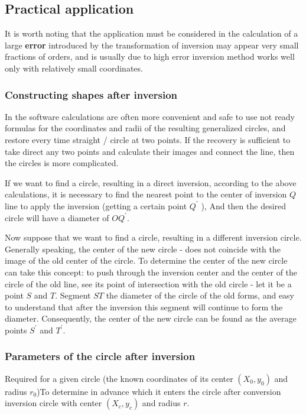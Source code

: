 \subsection{ Practical application }

It is worth noting that the application must be considered in the calculation of a large \textbf{error} introduced by the transformation of inversion may appear very small fractions of orders, and is usually due to high error inversion method works well only with relatively small coordinates.

\subsubsection{ Constructing shapes after inversion }

In the software calculations are often more convenient and safe to use not ready formulas for the coordinates and radii of the resulting generalized circles, and restore every time straight / circle at two points. If the recovery is sufficient to take direct any two points and calculate their images and connect the line, then the circles is more complicated.

If we want to find a circle, resulting in a direct inversion, according to the above calculations, it is necessary to find the nearest point to the center of inversion $Q$ line to apply the inversion (getting a certain point $Q ^ \prime$ ), And then the desired circle will have a diameter of $O Q ^ \prime$.

Now suppose that we want to find a circle, resulting in a different inversion circle. Generally speaking, the center of the new circle - does not coincide with the image of the old center of the circle. To determine the center of the new circle can take this concept: to push through the inversion center and the center of the circle of the old line, see its point of intersection with the old circle - let it be a point $S$ and $T$. Segment $ST$ the diameter of the circle of the old forms, and easy to understand that after the inversion this segment will continue to form the diameter. Consequently, the center of the new circle can be found as the average points $S ^ \prime$ and $T ^ \prime$.

\subsubsection{ Parameters of the circle after inversion }

Required for a given circle (the known coordinates of its center $(X_0, y_0)$ and radius $r_0$)To determine in advance which it enters the circle after conversion inversion circle with center $(X_c, y_c)$ and radius $r$.

